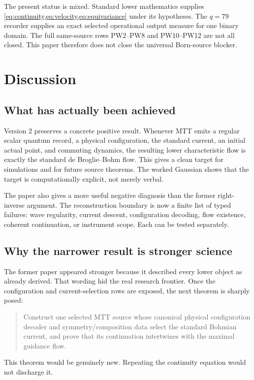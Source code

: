 \documentclass[11pt]{article}
\theoremstyle{definition}
\theoremstyle{remark}
\begin{document}
The present status is mixed.  Standard lower mathematics supplies
\cref{eq:continuity,eq:velocity,eq:equivariance} under its hypotheses.
The \(q=79\) recorder supplies an exact selected operational output measure
for one binary domain.  The full same-source rows PW2--PW8 and PW10--PW12
are not all closed.  This paper therefore does not close the universal
Born-source blocker.

\section{Discussion}
\label{sec:discussion}

\subsection{What has actually been achieved}

Version 2 preserves a concrete positive result.  Whenever MTT emits a
regular scalar quantum record, a physical configuration, the standard
current, an initial actual point, and commuting dynamics, the resulting
lower characteristic flow is exactly the standard de Broglie--Bohm flow.
This gives a clean target for simulations and for future source theorems.
The worked Gaussian shows that the target is computationally explicit, not
merely verbal.

The paper also gives a more useful negative diagnosis than the former
right-inverse argument.  The reconstruction boundary is now a finite list
of typed failures: wave regularity, current descent, configuration decoding,
flow existence, coherent continuation, or instrument scope.  Each can be
tested separately.

\subsection{Why the narrower result is stronger science}

The former paper appeared stronger because it described every lower object
as already derived.  That wording hid the real research frontier.  Once the
configuration and current-selection rows are exposed, the next theorem is
sharply posed:
\begin{quote}
Construct one selected MTT source whose canonical physical configuration
decoder and symmetry/composition data select the standard Bohmian current,
and prove that its continuation intertwines with the maximal guidance flow.
\end{quote}
This theorem would be genuinely new.  Repeating the continuity equation
would not discharge it.
\end{document}
